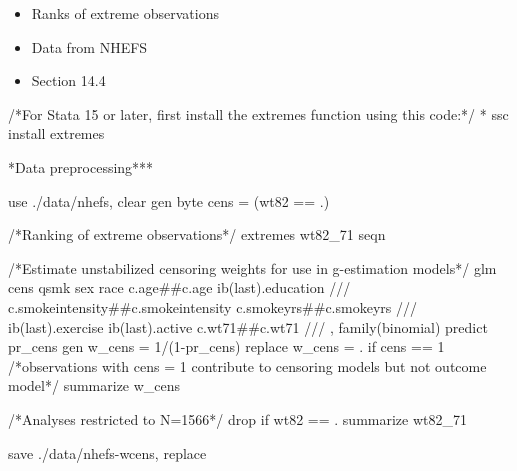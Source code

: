 \documentclass[
  10pt,
  a4paper,
]{book}
\newenvironment{Shaded}{\begin{snugshade}}{\end{snugshade}}
\newcommand{\CommentTok}[1]{\textcolor[rgb]{0.37,0.37,0.37}{#1}}
\newcommand{\FunctionTok}[1]{\textcolor[rgb]{0.28,0.35,0.67}{#1}}
\newcommand{\KeywordTok}[1]{\textcolor[rgb]{0.00,0.46,0.62}{#1}}
\newcommand{\NormalTok}[1]{\textcolor[rgb]{0.00,0.46,0.62}{#1}}
\providecommand{\tightlist}{%
  \setlength{\itemsep}{0pt}\setlength{\parskip}{0pt}}
\begin{document}
\begin{itemize}
\tightlist
\item
  Ranks of extreme observations
\item
  Data from NHEFS
\item
  Section 14.4
\end{itemize}

\begin{Shaded}
\begin{Highlighting}[]
\CommentTok{/*For Stata 15 or later, first install the extremes function using this code:*/}
\NormalTok{* }\KeywordTok{ssc}\NormalTok{ install extremes }

\NormalTok{*Data preprocessing***}

\KeywordTok{use}\NormalTok{ ./}\KeywordTok{data}\NormalTok{/nhefs, }\KeywordTok{clear}
\KeywordTok{gen} \KeywordTok{byte}\NormalTok{ cens = (wt82 == .)}

\CommentTok{/*Ranking of extreme observations*/}
\NormalTok{extremes wt82\_71 seqn}

\CommentTok{/*Estimate unstabilized censoring weights for use in g{-}estimation models*/}
\KeywordTok{glm}\NormalTok{ cens qsmk sex race c.age\#\#c.age ib(}\FunctionTok{last}\NormalTok{).education }\CommentTok{///}
\NormalTok{  c.smokeintensity\#\#c.smokeintensity c.smokeyrs\#\#c.smokeyrs }\CommentTok{///}
\NormalTok{  ib(}\FunctionTok{last}\NormalTok{).exercise ib(}\FunctionTok{last}\NormalTok{).active c.wt71\#\#c.wt71 }\CommentTok{///}
\NormalTok{  , }\KeywordTok{family}\NormalTok{(binomial)}
\KeywordTok{predict}\NormalTok{ pr\_cens}
\KeywordTok{gen}\NormalTok{ w\_cens = 1/(1{-}pr\_cens)}
\KeywordTok{replace}\NormalTok{ w\_cens = . }\KeywordTok{if}\NormalTok{ cens == 1 }
\CommentTok{/*observations with cens = 1 contribute to censoring models but not outcome model*/}
\KeywordTok{summarize}\NormalTok{ w\_cens}

\CommentTok{/*Analyses restricted to N=1566*/}
\KeywordTok{drop} \KeywordTok{if}\NormalTok{ wt82 == .}
\KeywordTok{summarize}\NormalTok{ wt82\_71}

\KeywordTok{save}\NormalTok{ ./}\KeywordTok{data}\NormalTok{/nhefs{-}wcens, }\KeywordTok{replace}
\end{Highlighting}
\end{Shaded}
\end{document}
